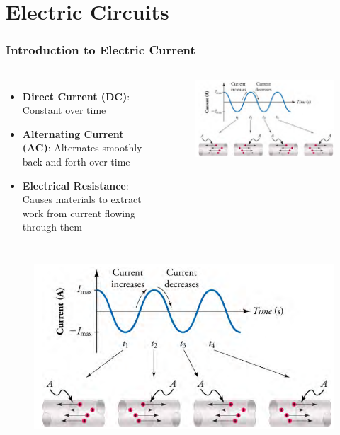 \documentclass{beamer}
\begin{document}
\section{Electric Circuits}

\begin{frame}
    \frametitle{Introduction to Electric Current}
    \begin{columns}
        \begin{itemize}
            \item \textbf{Direct Current (DC)}: Constant over time
            \item \textbf{Alternating Current (AC)}: Alternates smoothly back and forth over time
            \item \textbf{Electrical Resistance}: Causes materials to extract work from current flowing through them
        \end{itemize}
        
        \begin{alertblock}{ }
            \begin{figure}
                \centering
                \includegraphics[width=1\linewidth]{ACDCCOM.png}
            \end{figure}
        \end{alertblock}
    \end{columns}
\end{frame}
\begin{frame}{}
\begin{figure}
                \centering
                \includegraphics[width=1\linewidth]{ACDCCOM.png}
            \end{figure}    
\end{frame}
\end{document}
